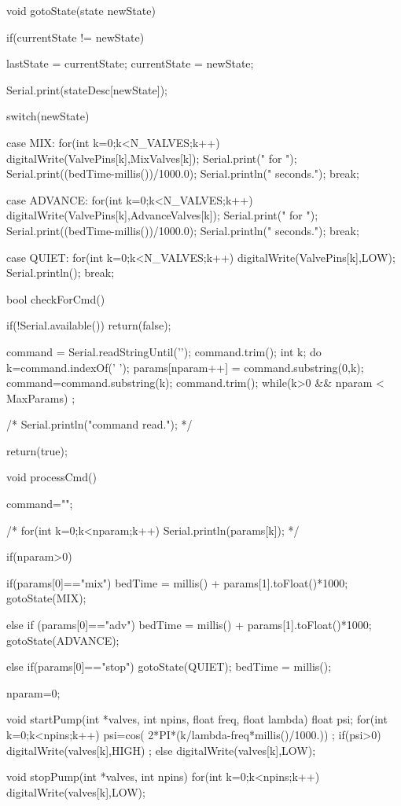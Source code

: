 void gotoState(state newState)
{
  if(currentState != newState) {
    lastState = currentState;
    currentState = newState;

    Serial.print(stateDesc[newState]);

    switch(newState) {
      case MIX:
        for(int k=0;k<N_VALVES;k++) digitalWrite(ValvePins[k],MixValves[k]);
        Serial.print(" for ");
        Serial.print((bedTime-millis())/1000.0);
        Serial.println(" seconds.");
        break;

      case ADVANCE:
        for(int k=0;k<N_VALVES;k++) digitalWrite(ValvePins[k],AdvanceValves[k]);
        Serial.print(" for ");
        Serial.print((bedTime-millis())/1000.0);
        Serial.println(" seconds.");
        break;

      case QUIET:
        for(int k=0;k<N_VALVES;k++) digitalWrite(ValvePins[k],LOW);
        Serial.println();
        break;
    }


  }
}

bool checkForCmd()
{
   if(!Serial.available()) return(false);

   command = Serial.readStringUntil('\n');
   command.trim();
   int k;
   do {
      k=command.indexOf(' ');
      params[nparam++] = command.substring(0,k);
      command=command.substring(k);
      command.trim();
   } while(k>0 && nparam < MaxParams) ;

   /* Serial.println("command read."); */

   return(true);
}

void processCmd()
{

  command="";

  /* for(int k=0;k<nparam;k++) {
    Serial.println(params[k]);
  } */

  if(nparam>0) {

     if(params[0]=="mix") {
      bedTime = millis() + params[1].toFloat()*1000;
      gotoState(MIX);
    }

     else if (params[0]=="adv") {
      bedTime = millis() + params[1].toFloat()*1000;
      gotoState(ADVANCE);
     }

     else if(params[0]=="stop") {
      gotoState(QUIET);
      bedTime = millis();
     }

  }

  nparam=0;
}


void startPump(int *valves, int npins, float freq, float lambda)
{
  float psi;
  for(int k=0;k<npins;k++) {
    psi=cos( 2*PI*(k/lambda-freq*millis()/1000.)) ;
    if(psi>0)
        digitalWrite(valves[k],HIGH) ;
    else
      digitalWrite(valves[k],LOW);
  }
}

void stopPump(int *valves, int npins)
{
  for(int k=0;k<npins;k++)
    digitalWrite(valves[k],LOW);
}
